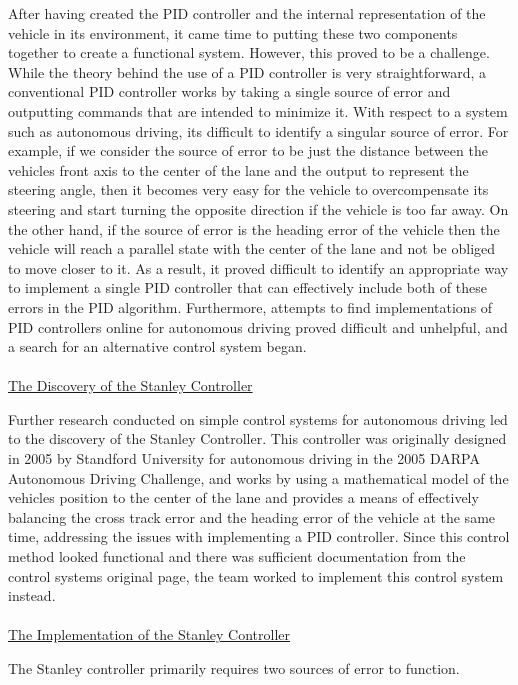 \documentclass[titlepage,draft]{article}
\begin{document}
{After having created the PID controller and the internal representation of the vehicle in its environment, it came time to putting these two components together to create a functional system. However, this proved to be a challenge. While the theory behind the use of a PID controller is very straightforward, a conventional PID controller works by taking a single source of error and outputting commands that are intended to minimize it. With respect to a system such as autonomous driving, its difficult to identify a singular source of error. For example, if we consider the source of error to be just the distance between the vehicles front axis to the center of the lane and the output to represent the steering angle, then it becomes very easy for the vehicle to overcompensate its steering and start turning the opposite direction if the vehicle is too far away. On the other hand, if the source of error is the heading error of the vehicle then the vehicle will reach a parallel state with the center of the lane and not be obliged to move closer to it. As a result, it proved difficult to identify an appropriate way to implement a single PID controller that can effectively include both of these errors in the PID algorithm. Furthermore, attempts to find implementations of PID controllers online for autonomous driving proved difficult and unhelpful, and a search for an alternative control system began.\\~\\
\underline{The Discovery of the Stanley Controller}

Further research conducted on simple control systems for autonomous driving led to the discovery of the Stanley Controller. This controller was originally designed in 2005 by Standford University for autonomous driving in the 2005 DARPA Autonomous Driving Challenge, and works by using a mathematical model of the vehicles position to the center of the lane and provides a means of effectively balancing the cross track error and the heading error of the vehicle at the same time, addressing the issues with implementing a PID controller. Since this control method looked functional and there was sufficient documentation from the control systems original page, the team worked to implement this control system instead.\\~\\
\underline{The Implementation of the Stanley Controller}

The Stanley controller primarily requires two sources of error to function.

}
\end{document}
